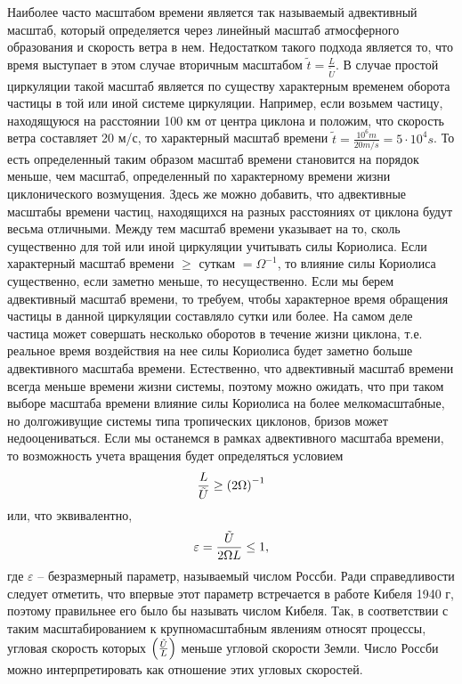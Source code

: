 Наиболее часто масштабом времени является так называемый адвективный масштаб, который определяется через линейный масштаб атмосферного образования и скорость ветра в нем. Недостатком такого подхода является то, что время выступает в этом случае вторичным масштабом $\tilde{t}=\frac{L}{\tilde{U}}$. В случае простой циркуляции такой масштаб является по существу характерным временем оборота частицы в той или иной системе циркуляции. Например, если возьмем частицу, находящуюся на расстоянии 100 км от центра циклона и положим, что скорость ветра составляет 20 м/с, то характерный масштаб времени $\tilde{t}=\frac{10^6m}{20 m/s}=5\cdot 10^4s$. То есть определенный таким образом масштаб времени становится на порядок меньше, чем масштаб, определенный по характерному времени жизни циклонического возмущения. Здесь же можно добавить, что адвективные масштабы времени частиц, находящихся на разных расстояниях от циклона будут весьма отличными. Между тем масштаб времени указывает на то, сколь существенно для той или иной циркуляции учитывать силы Кориолиса. Если характерный масштаб времени $\geq$ суткам $=\Omega^{-1}$, то влияние силы Кориолиса существенно, если заметно меньше, то несущественно. Если мы берем адвективный масштаб времени, то требуем, чтобы характерное время обращения частицы в данной циркуляции составляло сутки или более. На самом деле частица может совершать несколько оборотов в течение жизни циклона, т.е. реальное время воздействия на нее силы Кориолиса будет заметно больше адвективного масштаба времени. Естественно, что адвективный масштаб времени всегда меньше времени жизни системы, поэтому можно ожидать, что при таком выборе масштаба времени влияние силы Кориолиса на более мелкомасштабные, но долгоживущие системы типа тропических циклонов, бризов может недооцениваться. Если мы останемся в рамках адвективного масштаба времени, то возможность учета вращения будет определяться условием 
\begin{equation}
    \frac{L}{\Tilde{U}}\geq \left( 2\Omega \right)^{-1}
\end{equation}
или, что эквивалентно, 
\begin{equation}
    \varepsilon=\frac{\Tilde{U}}{2\Omega L}\leq 1,
\end{equation}
где $\varepsilon$ -- безразмерный параметр, называемый числом Россби. Ради справедливости следует отметить, что впервые этот параметр встречается в работе {\color{warn} Кибеля 1940 г}, поэтому правильнее его было бы называть числом Кибеля. Так, в соответствии с таким масштабированием к крупномасштабным явлениям относят процессы, угловая скорость которых $\left( \frac{\Tilde{U}}{L} \right)$ меньше угловой скорости Земли. Число Россби можно интерпретировать как отношение этих угловых скоростей.

